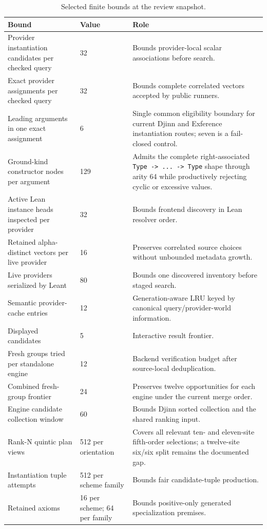 \documentclass[11pt]{article}
\newcommand{\code}[1]{\texttt{#1}}
\newcommand{\Djinn}{Djinn}
\newcommand{\Exference}{Exference}
\begin{document}
\begin{table}[H]
\centering
\small
\caption{Selected finite bounds at the review snapshot.}
\label{tab:bounds}
\begin{tabularx}{\textwidth}{L{4.35cm} C{1.8cm} Y}
\toprule
\textbf{Bound} & \textbf{Value} & \textbf{Role} \\
\midrule
Provider instantiation candidates per checked query & 32 &
Bounds provider-local scalar associations before search. \\
Exact provider assignments per checked query & 32 &
Bounds complete correlated vectors accepted by public runners. \\
Leading arguments in one exact assignment & 6 &
Single common eligibility boundary for current \Djinn{} and \Exference{}
instantiation routes; seven is a fail-closed control. \\
Ground-kind constructor nodes per argument & 129 &
Admits the complete right-associated \code{Type -> ... -> Type} shape through
arity 64 while productively rejecting cyclic or excessive values. \\
Active Lean instance heads inspected per provider & 32 &
Bounds frontend discovery in Lean resolver order. \\
Retained alpha-distinct vectors per live provider & 16 &
Preserves correlated source choices without unbounded metadata growth. \\
Live providers serialized by Leant & 80 &
Bounds one discovered inventory before staged search. \\
Semantic provider-cache entries & 12 &
Generation-aware LRU keyed by canonical query/provider-world information. \\
Displayed candidates & 5 &
Interactive result frontier. \\
Fresh groups tried per standalone engine & 12 &
Backend verification budget after source-local deduplication. \\
Combined fresh-group frontier & 24 &
Preserves twelve opportunities for each engine under the current merge order. \\
Engine candidate collection window & 60 &
Bounds \Djinn{} sorted collection and the shared ranking input. \\
Rank-N quintic plan views & 512 per orientation &
Covers all relevant ten- and eleven-site fifth-order selections; a twelve-site
six/six split remains the documented gap. \\
Instantiation tuple attempts & 512 per scheme family &
Bounds fair candidate-tuple production. \\
Retained axioms & 16 per scheme; 64 per family &
Bounds positive-only generated specialization premises. \\
\bottomrule
\end{tabularx}
\end{table}
\end{document}
